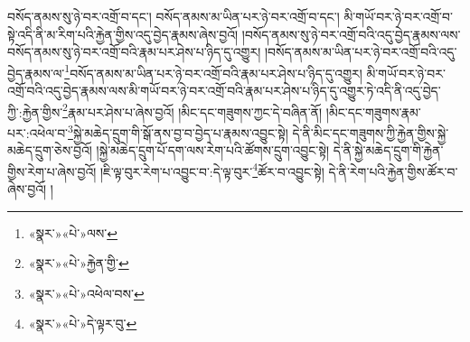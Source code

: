 བསོད་ནམས་སུ་ཉེ་བར་འགྲོ་བ་དང་། བསོད་ནམས་མ་ཡིན་པར་ཉེ་བར་འགྲོ་བ་དང་། མི་གཡོ་བར་ཉེ་བར་འགྲོ་བ་སྟེ་འདི་ནི་མ་རིག་པའི་རྐྱེན་གྱིས་འདུ་བྱེད་རྣམས་ཞེས་བྱའོ། །བསོད་ནམས་སུ་ཉེ་བར་འགྲོ་བའི་འདུ་བྱེད་རྣམས་ལས་བསོད་ནམས་སུ་ཉེ་བར་འགྲོ་བའི་རྣམ་པར་ཤེས་པ་ཉིད་དུ་འགྱུར། །བསོད་ནམས་མ་ཡིན་པར་ཉེ་བར་འགྲོ་བའི་འདུ་བྱེད་རྣམས་ལ་\footnote{«སྣར་»«པེ་»ལས་}བསོད་ནམས་མ་ཡིན་པར་ཉེ་བར་འགྲོ་བའི་རྣམ་པར་ཤེས་པ་ཉིད་དུ་འགྱུར། མི་གཡོ་བར་ཉེ་བར་འགྲོ་བའི་འདུ་བྱེད་རྣམས་ལས་མི་གཡོ་བར་ཉེ་བར་འགྲོ་བའི་རྣམ་པར་ཤེས་པ་ཉིད་དུ་འགྱུར་ཏེ་འདི་ནི་འདུ་བྱེད་ཀྱི་:རྐྱེན་གྱིས་\footnote{«སྣར་»«པེ་»རྐྱེན་གྱི་}རྣམ་པར་ཤེས་པ་ཞེས་བྱའོ། །མིང་དང་གཟུགས་ཀྱང་དེ་བཞིན་ནོ། །མིང་དང་གཟུགས་རྣམ་པར་:འཕེལ་བ་\footnote{«སྣར་»«པེ་»འཕེལ་བས་}སྐྱེ་མཆེད་དྲུག་གི་སྒོ་ནས་བྱ་བ་བྱེད་པ་རྣམས་འབྱུང་སྟེ། དེ་ནི་མིང་དང་གཟུགས་ཀྱི་རྐྱེན་གྱིས་སྐྱེ་མཆེད་དྲུག་ཅེས་བྱའོ། །སྐྱེ་མཆེད་དྲུག་པོ་དག་ལས་རེག་པའི་ཚོགས་དྲུག་འབྱུང་སྟེ། དེ་ནི་སྐྱེ་མཆེད་དྲུག་གི་རྐྱེན་གྱིས་རེག་པ་ཞེས་བྱའོ། །ཇི་ལྟ་བུར་རེག་པ་འབྱུང་བ་:དེ་ལྟ་བུར་\footnote{«སྣར་»«པེ་»དེ་ལྟར་བུ་}ཚོར་བ་འབྱུང་སྟེ། དེ་ནི་རེག་པའི་རྐྱེན་གྱིས་ཚོར་བ་ཞེས་བྱའོ། །
